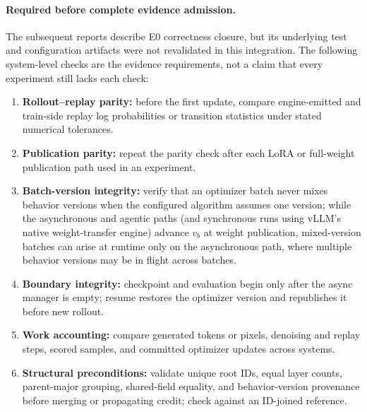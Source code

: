 \documentclass[10pt]{article}
\begin{document}
\paragraph{Required before complete evidence admission.}
The subsequent reports describe E0 correctness closure, but its underlying test and configuration artifacts were not revalidated in this integration.
The following system-level checks are the evidence requirements, not a claim that every experiment still lacks each check:
\begin{enumerate}
  \item \textbf{Rollout--replay parity:} before the first update, compare engine-emitted and train-side replay log probabilities or transition statistics under stated numerical tolerances.
  \item \textbf{Publication parity:} repeat the parity check after each LoRA or full-weight publication path used in an experiment.
  \item \textbf{Batch-version integrity:} verify that an optimizer batch never mixes behavior versions when the configured algorithm assumes one version; while the asynchronous and agentic paths (and synchronous runs using vLLM's native weight-transfer engine) advance $v_b$ at weight publication, mixed-version batches can arise at runtime only on the asynchronous path, where multiple behavior versions may be in flight across batches.
  \item \textbf{Boundary integrity:} checkpoint and evaluation begin only after the async manager is empty; resume restores the optimizer version and republishes it before new rollout.
  \item \textbf{Work accounting:} compare generated tokens or pixels, denoising and replay steps, scored samples, and committed optimizer updates across systems.
  \item \textbf{Structural preconditions:} validate unique root IDs, equal layer counts, parent-major grouping, shared-field equality, and behavior-version provenance before merging or propagating credit; check against an ID-joined reference.
\end{enumerate}
\end{document}
